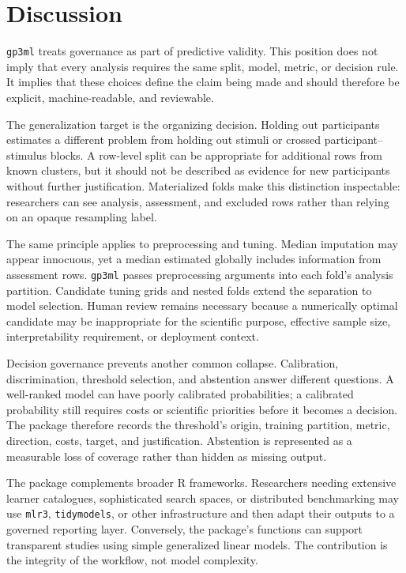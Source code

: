 \section{Discussion}\label{discussion}

\texttt{gp3ml} treats governance as part of predictive validity. This position does not imply that every analysis requires the same split, model, metric, or decision rule. It implies that these choices define the claim being made and should therefore be explicit, machine-readable, and reviewable.

The generalization target is the organizing decision. Holding out participants estimates a different problem from holding out stimuli or crossed participant--stimulus blocks. A row-level split can be appropriate for additional rows from known clusters, but it should not be described as evidence for new participants without further justification. Materialized folds make this distinction inspectable: researchers can see analysis, assessment, and excluded rows rather than relying on an opaque resampling label.

The same principle applies to preprocessing and tuning. Median imputation may appear innocuous, yet a median estimated globally includes information from assessment rows. \texttt{gp3ml} passes preprocessing arguments into each fold's analysis partition. Candidate tuning grids and nested folds extend the separation to model selection. Human review remains necessary because a numerically optimal candidate may be inappropriate for the scientific purpose, effective sample size, interpretability requirement, or deployment context.

Decision governance prevents another common collapse. Calibration, discrimination, threshold selection, and abstention answer different questions. A well-ranked model can have poorly calibrated probabilities; a calibrated probability still requires costs or scientific priorities before it becomes a decision. The package therefore records the threshold's origin, training partition, metric, direction, costs, target, and justification. Abstention is represented as a measurable loss of coverage rather than hidden as missing output.

The package complements broader R frameworks. Researchers needing extensive learner catalogues, sophisticated search spaces, or distributed benchmarking may use \texttt{mlr3}, \texttt{tidymodels}, or other infrastructure and then adapt their outputs to a governed reporting layer. Conversely, the package's functions can support transparent studies using simple generalized linear models. The contribution is the integrity of the workflow, not model complexity.

